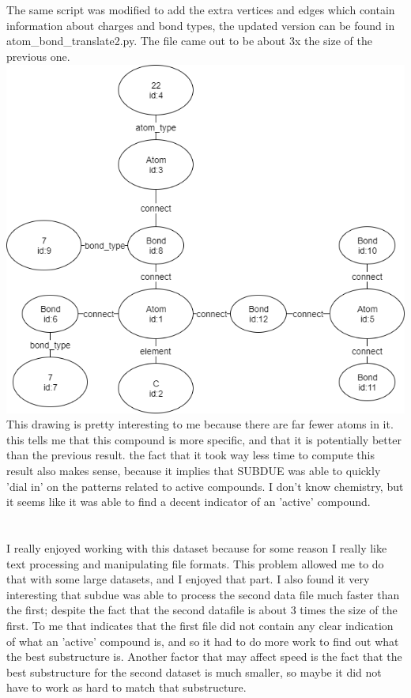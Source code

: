 \documentclass{article}
\begin{document}
\section{}
The same script was modified to add the extra vertices and edges which contain 
information about charges and bond types, the updated version can be found in 
atom\_bond\_translate2.py. The file came out to be about 3x the size of the 
previous one.\\
\includegraphics[scale=.5]{question6Pic.png}\\
This drawing is pretty interesting to me because there are far fewer atoms in
it. this tells me that this compound is more specific, and that it is 
potentially better than the previous result. the fact that it took way less
time to compute this result also makes sense, because it implies that SUBDUE
was able to quickly 'dial in' on the patterns related to active compounds.
I don't know chemistry, but it seems like it was able to find a decent indicator
of an 'active' compound.

\section{}
I really enjoyed working with this dataset because for some reason I really like
text processing and manipulating file formats. This problem allowed me to do 
that with some large datasets, and I enjoyed that part. I also found it very
interesting that subdue was able to process the second data file much faster
than the first; despite the fact that the second datafile is about 3 times the
size of the first. To me that indicates that the first file did not contain any
clear indication of what an 'active' compound is, and so it had to do more work
to find out what the best substructure is. Another factor that may affect speed
is the fact that the best substructure for the second dataset is much smaller,
so maybe it did not have to work as hard to match that substructure.
\end{document}
